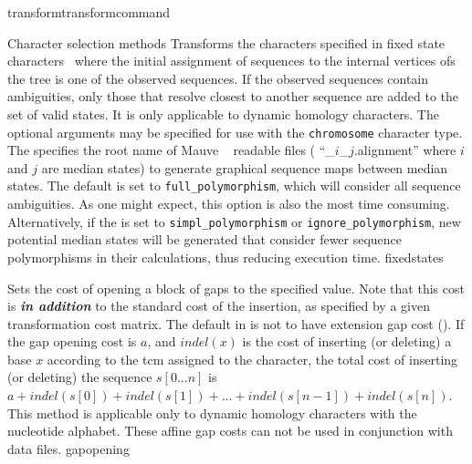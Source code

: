 \begin{command}{transform}{transformcommand}
\begin{arguments}
\begin{argumentgroup}{Character selection methods}
{Transforms the characters specified in fixed state characters~\cite{wheeler1999a}
where the initial assignment of sequences to the internal vertices ofs
the tree is one of the observed sequences. If the observed sequences
contain ambiguities, only those that resolve closest to another
sequence are added to the set of valid states. It is only
applicable to dynamic homology characters. The optional arguments 
may be specified for use with the \texttt{chromosome} character type. 
The \poystring specifies the root name of Mauve ~\cite{darlingetal2004} 
readable files ( ``\poystring\_$i$\_$j$.alignment'' where $i$ and $j$ are 
median states) to generate graphical sequence maps between median states. 
The default \poylident is set to \texttt{full\_polymorphism}, which will 
consider all sequence ambiguities. As one might expect, this option is also the most 
time consuming. Alternatively, if the \poylident is set to \texttt{simpl\_polymorphism} 
or \texttt{ignore\_polymorphism}, new potential median states will be generated that consider fewer 
sequence polymorphisms in their calculations, thus reducing execution time.}
{fixedstates}

{Sets the cost of opening a block of gaps to the specified value. Note that
this cost is {\bf \emph{in addition}} to the standard cost of the insertion, as
specified by a given transformation cost matrix.
The default in \poy is not to have extension
gap cost (). If the gap
opening cost is
$a$, and $indel(x)$ is the cost of inserting (or deleting) a
base $x$ according to the tcm assigned to the character, the total
cost of inserting (or deleting) the sequence $s[0...n]$ is $a +
indel(s[0]) + indel(s[1]) + ... + indel(s[n - 1]) + indel(s[n]).$
This method is applicable only to dynamic homology characters with
the nucleotide alphabet. These affine gap costs can not be used
in conjunction with  data files.} 
{gapopening}


\end{argumentgroup}
\end{arguments}
\end{command}
